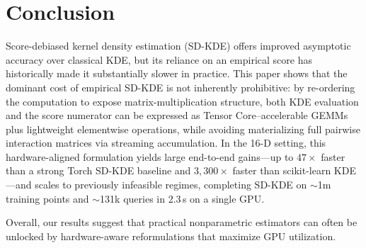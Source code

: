 \section{Conclusion}
\label{sec:conclusion}
Score-debiased kernel density estimation (SD-KDE) offers improved asymptotic accuracy over classical KDE, but its reliance on an empirical score has historically made it substantially slower in practice. 
This paper shows that the dominant cost of empirical SD-KDE is not inherently prohibitive: by re-ordering the computation to expose matrix-multiplication structure, both KDE evaluation and the score numerator can be expressed as Tensor Core--accelerable GEMMs plus lightweight elementwise operations, while avoiding materializing full pairwise interaction matrices via streaming accumulation. 
In the 16-D setting, this hardware-aligned formulation yields large end-to-end gains---up to $47\times$ faster than a strong Torch SD-KDE baseline and $3{,}300\times$ faster than scikit-learn KDE---and scales to previously infeasible regimes, completing SD-KDE on $\sim$1m training points and $\sim$131k queries in 2.3\,s on a single GPU. 

 Overall, our results suggest that practical nonparametric estimators can often be unlocked by hardware-aware reformulations that maximize GPU utilization.
